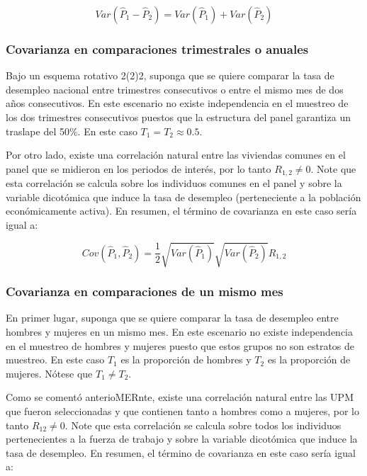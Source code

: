 \documentclass[
  12pt,
  spanish,
]{book}
\begin{document}
\[
Var(\hat{P}_1-\hat{P}_2) 
= Var(\hat{P}_1) + Var(\hat{P}_2)
\]

\hypertarget{covarianza-en-comparaciones-trimestrales-o-anuales}{%
\subsubsection*{Covarianza en comparaciones trimestrales o anuales}\label{covarianza-en-comparaciones-trimestrales-o-anuales}}

Bajo un esquema rotativo 2(2)2, suponga que se quiere comparar la tasa de desempleo nacional entre trimestres consecutivos o entre el mismo mes de dos años consecutivos. En este escenario no existe independencia en el muestreo de los dos trimestres consecutivos puestos que la estructura del panel garantiza un traslape del 50\%. En este caso \(T_1 = T_2 \approx 0.5\).

Por otro lado, existe una correlación natural entre las viviendas comunes en el panel que se midieron en los periodos de interés, por lo tanto \(R_{1,2} \neq 0\). Note que esta correlación se calcula sobre los individuos comunes en el panel y sobre la variable dicotómica que induce la tasa de desempleo (perteneciente a la población económicamente activa). En resumen, el término de covarianza en este caso sería igual a:

\[
Cov(\hat{P}_1, \hat{P}_2) = \frac{1}{2}\sqrt{Var(\hat{P}_1)}\sqrt{Var(\hat{P}_2)}R_{1,2}
\]

\hypertarget{covarianza-en-comparaciones-de-un-mismo-mes}{%
\subsubsection*{Covarianza en comparaciones de un mismo mes}\label{covarianza-en-comparaciones-de-un-mismo-mes}}

En primer lugar, suponga que se quiere comparar la tasa de desempleo entre hombres y mujeres en un mismo mes. En este escenario no existe independencia en el muestreo de hombres y mujeres puesto que estos grupos no son estratos de muestreo. En este caso \(T_1\) es la proporción de hombres y \(T_2\) es la proporción de mujeres. Nótese que \(T_1 \neq T_2\).

Como se comentó anterioMERnte, existe una correlación natural entre las UPM que fueron seleccionadas y que contienen tanto a hombres como a mujeres, por lo tanto \(R_{12} \neq 0\). Note que esta correlación se calcula sobre todos los individuos pertenecientes a la fuerza de trabajo y sobre la variable dicotómica que induce la tasa de desempleo. En resumen, el término de covarianza en este caso sería igual a:
\end{document}
